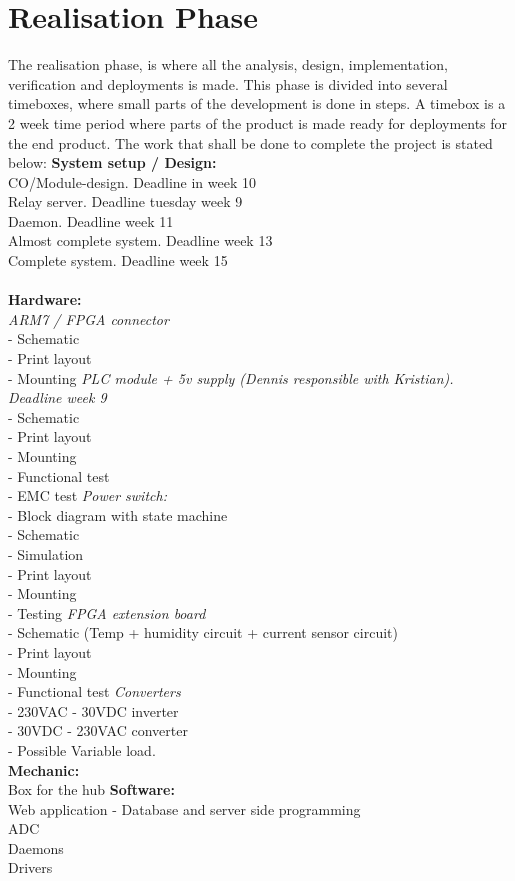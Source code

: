 \chapter{Realisation Phase}
The realisation phase, is where all the analysis, design, implementation, verification and deployments is made. This phase is divided into several timeboxes, where small parts of the development is done in steps. A timebox is a 2 week time period where parts of the product is made ready for deployments for the end product.
\p The work that shall be done to complete the project is stated below:\p
\textbf{System setup / Design:}\\
CO/Module-design. Deadline in week 10\\
Relay server. Deadline tuesday week 9\\
Daemon. Deadline week 11\\
Almost complete system. Deadline week 13\\
Complete system. Deadline week 15\\
\\
\textbf{Hardware:}\\
\textit{ARM7 / FPGA connector}\\
- Schematic\\
- Print layout\\
- Mounting\p
\textit{PLC module + 5v supply (Dennis responsible with Kristian). Deadline week 9}\\
- Schematic\\
- Print layout\\
- Mounting\\
- Functional test\\
- EMC test\p
\textit{Power switch:}\\
	- Block diagram with state machine\\
	- Schematic\\
	- Simulation\\
	- Print layout\\
	- Mounting\\
	- Testing\p
\textit{FPGA extension board}\\
- Schematic (Temp + humidity circuit + current sensor circuit)\\
- Print layout\\
- Mounting\\
- Functional test\p
\textit{Converters}\\
- 230VAC - 30VDC inverter\\
- 30VDC - 230VAC converter\\
- Possible Variable load.\\\p
\textbf{Mechanic:}\\
Box for the hub\p
\textbf{Software:}\\
Web application - Database and server side programming\\
ADC\\
Daemons\\
Drivers\\

